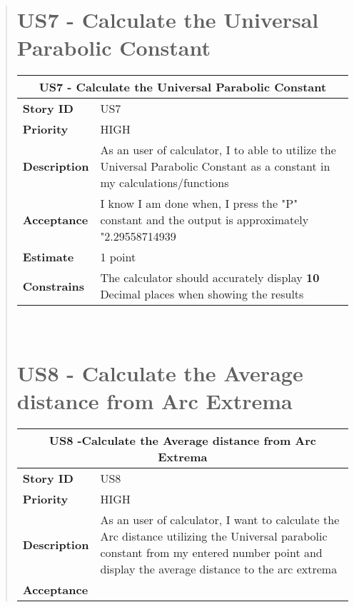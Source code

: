 \documentclass[12pt]{report}
\begin{document}
\begin{quote}
              \section{US7 - Calculate the Universal Parabolic Constant}
                \begin{tabular}{ |p{4cm}|p{10cm}| }
                 \hline
                 \multicolumn{2}{|c|}{\textbf{US7 - Calculate the Universal Parabolic Constant} } \\
                 \hline
                 \textbf {Story ID}& US7  \\
                 \hline
                 \textbf{Priority} & HIGH \\
                 \hline
                 \textbf{Description}   & As an user of calculator, I to able to utilize the Universal Parabolic Constant as a constant in my calculations/functions \\
                 \hline
                 \textbf{Acceptance}& 
                
                 I know I am done when, I press the "P" constant and the output is approximately "2.29558714939 \\
                 \hline
                 \textbf{Estimate} &  1  point  \\
                 \hline
                 \textbf{Constrains}& The calculator should accurately display  \textbf{10} Decimal places when showing the results \\
                 \hline
                \end{tabular}
            \hfill\break\\
            
             \section{US8 - Calculate the Average distance from Arc Extrema}
                \begin{tabular}{ |p{4cm}|p{10cm}| }
                 \hline
                 \multicolumn{2}{|c|}{\textbf{US8 -Calculate the Average distance from Arc Extrema} } \\
                 \hline
                 \textbf {Story ID}& US8  \\
                 \hline
                 \textbf{Priority} & HIGH \\
                 \hline
                 \textbf{Description}   & As an user of calculator, I want to calculate the Arc distance utilizing the Universal parabolic constant from my entered number point and display the average distance to the arc extrema  \\
                 \hline
                 \textbf{Acceptance}& 
                

\end{tabular}
\end{quote}
\end{document}
